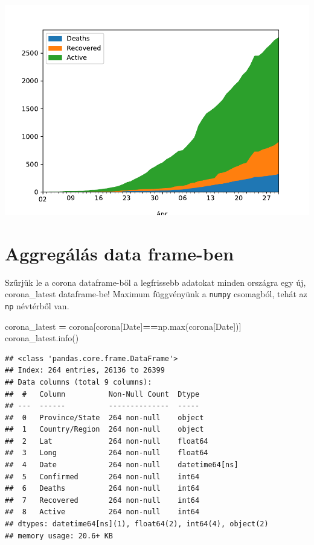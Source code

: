 \documentclass[
]{book}
\newenvironment{Shaded}{\begin{snugshade}}{\end{snugshade}}
\newcommand{\BuiltInTok}[1]{#1}
\newcommand{\NormalTok}[1]{#1}
\newcommand{\OperatorTok}[1]{\textcolor[rgb]{0.81,0.36,0.00}{\textbf{#1}}}
\newcommand{\StringTok}[1]{\textcolor[rgb]{0.31,0.60,0.02}{#1}}
\begin{document}
\includegraphics{_main_files/figure-latex/unnamed-chunk-87-1.pdf}

\section{Aggregálás data frame-ben}\label{aggreguxe1luxe1s-data-frame-ben}

Szűrjük le a corona dataframe-ből a legfrissebb adatokat minden országra egy új, corona\_latest dataframe-be!
Maximum függvényünk a \texttt{numpy} csomagból, tehát az \texttt{np} névtérből van.

\begin{Shaded}
\begin{Highlighting}[]
\NormalTok{corona\_latest }\OperatorTok{=}\NormalTok{ corona[corona[}\StringTok{\textquotesingle{}Date\textquotesingle{}}\NormalTok{]}\OperatorTok{==}\NormalTok{np.}\BuiltInTok{max}\NormalTok{(corona[}\StringTok{\textquotesingle{}Date\textquotesingle{}}\NormalTok{])]}
\NormalTok{corona\_latest.info()}
\end{Highlighting}
\end{Shaded}

\begin{verbatim}
## <class 'pandas.core.frame.DataFrame'>
## Index: 264 entries, 26136 to 26399
## Data columns (total 9 columns):
##  #   Column          Non-Null Count  Dtype         
## ---  ------          --------------  -----         
##  0   Province/State  264 non-null    object        
##  1   Country/Region  264 non-null    object        
##  2   Lat             264 non-null    float64       
##  3   Long            264 non-null    float64       
##  4   Date            264 non-null    datetime64[ns]
##  5   Confirmed       264 non-null    int64         
##  6   Deaths          264 non-null    int64         
##  7   Recovered       264 non-null    int64         
##  8   Active          264 non-null    int64         
## dtypes: datetime64[ns](1), float64(2), int64(4), object(2)
## memory usage: 20.6+ KB
\end{verbatim}
\end{document}
